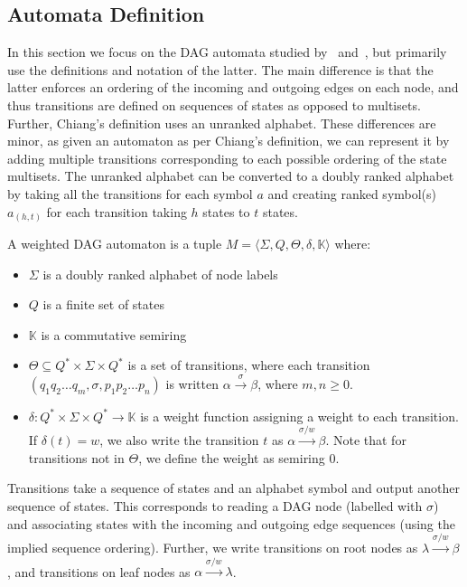 \documentclass[11pt]{article}
\begin{document}
\subsection{Automata Definition}
In this section we focus on the DAG automata studied
by~\cite{chiang2018weighted} and~\cite{blum2019properties}, but primarily use
the definitions and notation of the latter. The main difference is that the
latter enforces an ordering of the incoming and outgoing edges on each node, and
thus transitions are defined on sequences of states as opposed to multisets.
Further, Chiang's definition uses an unranked alphabet. These differences are
minor, as given an automaton as per Chiang's definition, we can represent it by
adding multiple transitions corresponding to each possible ordering of the state
multisets. The unranked alphabet can be converted to a doubly ranked alphabet by
taking all the transitions for each symbol $a$ and creating ranked symbol(s)
$a_{(h,t)}$ for each transition taking $h$ states to $t$ states.
\begin{definition}\label{def:dagautomaton} A weighted DAG
  automaton is a tuple $M = \langle \Sigma, Q, \Theta, \delta, \mathbb{K}
  \rangle$ where:
  \begin{itemize}
    \item $\Sigma$ is a doubly ranked alphabet of node labels
    \item $Q$ is a finite set of states
    \item $\mathbb{K}$ is a commutative semiring
    \item $\Theta \subseteq Q^* \times \Sigma \times Q^*$ is a set of
    transitions, where each transition $\left( q_1q_2\ldots q_m, \sigma,
    p_1p_2\ldots p_n \right)$ is written $\alpha \xrightarrow{\sigma}\beta$,
    where $m,n \ge 0$.
    \item $\delta: Q^* \times \Sigma \times Q^* \rightarrow \mathbb{K}$ is a
    weight function assigning a weight to each transition. If $\delta(t) = w$,
    we also write the transition $t$ as $\alpha \xrightarrow{\sigma/w}\beta$.
    Note that for transitions not in $\Theta$, we define the weight as semiring
    $0$.
  \end{itemize}
\end{definition}

Transitions take a sequence of states and an alphabet symbol and output another
sequence of states. This corresponds to reading a DAG node (labelled with
$\sigma$) and associating states with the incoming and outgoing edge sequences
(using the implied sequence ordering). Further, we write transitions on root
nodes as $\lambda \xrightarrow{\sigma/w} \beta$, and transitions on leaf nodes
as $\alpha \xrightarrow{\sigma/w} \lambda$. 
\end{document}
